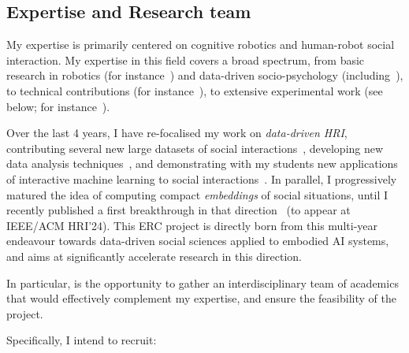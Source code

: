 \subsection{Expertise and Research team}
\label{research-team}

My expertise is primarily centered on cognitive robotics and human-robot social
interaction. My expertise in this field covers a broad spectrum, from basic
research in robotics (for
instance~\cite{lemaignan2014dynamics,lemaignan2015mutual}) and data-driven
socio-psychology
(including~\cite{lemaignan2014cognitive,irfan2018social,winkle2019effective,bartlett2019what}),
to technical contributions (for instance~\cite{lemaignan2010oro,
lemaignan2017artificial, lemaignan2018underworlds}), to extensive experimental
work (see below; for instance~\cite{hood2015cowriter,winkle2020couch,
lemaignan2022social}).

Over the last 4 years, I have re-focalised my work on \emph{data-driven HRI},
contributing several new large datasets of social
interactions~\cite{lemaignan2018pinsoro,sallami2020unexpected,webb2023sogrin},
developing new data analysis
techniques~\cite{bartlett2019what,webb2022measuring}, and demonstrating with my
students new applications of interactive machine learning to social
interactions~\cite{senft2016sparc,winkle2020couch,winkle2021leador}.  In
parallel, I progressively matured the idea of computing compact
\emph{embeddings} of social situations, until I recently published a first
breakthrough in that direction~\cite{lemaignan2024social} (to appear at IEEE/ACM
HRI'24). This ERC project is directly born from this multi-year endeavour
towards data-driven social sciences applied to embodied AI systems, and aims at
significantly accelerate research in this direction.

In particular, \project is the opportunity to gather an interdisciplinary team
of academics that would effectively complement my expertise, and ensure the
feasibility of the project.

Specifically, I intend to recruit:

